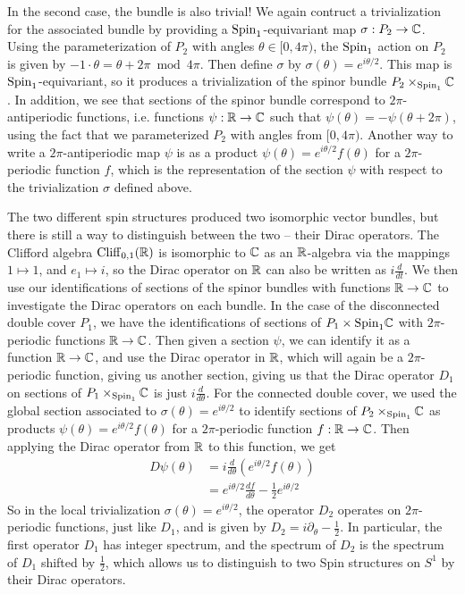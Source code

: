 \begin{exmp}
In the second case, the bundle is also trivial! We again contruct a trivialization
for the associated bundle by providing a $\mathrm{Spin}_1$-equivariant map
$\sigma : P_2 \to \mathbb{C}$. Using the parameterization of $P_2$ with angles
$\theta \in [0,4\pi)$, the $\mathrm{Spin}_1$ action on $P_2$ is given by
$-1 \cdot \theta = \theta + 2\pi \bmod 4\pi$. Then define $\sigma$ by
$\sigma(\theta) = e^{i\theta/2}$. This map is $\mathrm{Spin}_1$-equivariant, so
it produces a trivialization of the spinor bundle $P_2 \times_{\mathrm{Spin}_1} \mathbb{C}$.
In addition, we see that sections of the spinor bundle correspond
to $2\pi$-antiperiodic functions, i.e. functions $\psi : \mathbb{R} \to \mathbb{C}$ such that
$\psi(\theta) = -\psi(\theta + 2\pi)$, using the fact that we parameterized $P_2$
with angles from $[0, 4\pi)$. Another way to write a $2\pi$-antiperiodic map
$\psi$ is as a product $\psi(\theta) = e^{i\theta/2}f(\theta)$ for a $2\pi$-periodic
function $f$, which is the representation of the section $\psi$ with respect to the
trivialization $\sigma$ defined above.

The two different spin structures produced two isomorphic vector bundles,
but there is still a way to distinguish between the two -- their Dirac operators.
The Clifford algebra $\operatorname{Cliff}_{0,1}(\mathbb{R})$ is isomorphic to $\mathbb{C}$ as an $\mathbb{R}$-algebra
via the mappings $1 \mapsto 1$, and $e_1 \mapsto i$, so the Dirac operator on
$\mathbb{R}$ can also be written as $i \frac{d}{dt}$. We then use our identifications
of sections of the spinor bundles with functions $\mathbb{R} \to \mathbb{C}$ to investigate the
Dirac operators on each bundle. In the case of the disconnected double cover $P_1$,
we have the identifications of sections of $P_1 \times{\mathrm{Spin}_1} \mathbb{C}$ with
$2\pi$-periodic functions $\mathbb{R} \to \mathbb{C}$. Then given a section $\psi$, we
can identify it as a function $\mathbb{R} \to \mathbb{C}$, and use the Dirac operator in $\mathbb{R}$,
which will again be a $2\pi$-periodic function, giving us another section,
giving us that the Dirac operator $D_1$ on sections of $P_1 \times_{\mathrm{Spin}_1} \mathbb{C}$
is just $i\frac{d}{d\theta}$. For the connected double cover, we used the
global section associated to $\sigma(\theta) = e^{i\theta /2}$ to identify
sections of $P_2 \times_{\mathrm{Spin}_1} \mathbb{C}$ as products
$\psi(\theta) = e^{i\theta/2}f(\theta)$ for a $2\pi$-periodic function $f : \mathbb{R} \to \mathbb{C}$.
Then applying the Dirac operator from $\mathbb{R}$ to this function, we get
%
\begin{align*}
D\psi(\theta) &= i\frac{d}{d\theta}\left( e^{i\theta/2}f(\theta) \right) \\
&= e^{i\theta/2}\frac{d f}{d \theta} - \frac{1}{2}e^{i\theta/2}
\end{align*}
%
So in the local trivialization $\sigma(\theta) = e^{i\theta/2}$, the operator $D_2$
operates on $2\pi$-periodic functions, just like $D_1$, and is given by
$D_2 = i\partial_\theta - \frac{1}{2}$. In particular, the first operator $D_1$ has
integer spectrum, and the spectrum of $D_2$ is the spectrum of $D_1$ shifted by
$\frac{1}{2}$, which allows us to distinguish to two Spin structures on $S^1$
by their Dirac operators.
%
\end{exmp}
